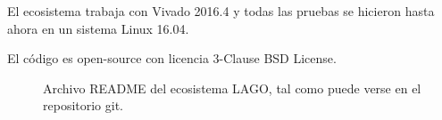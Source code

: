 \documentclass[a4paper,11pt]{article}
\begin{document}
El ecosistema trabaja con Vivado 2016.4
y todas las pruebas se hicieron hasta ahora en un sistema Linux 16.04.
  
El código es open-source con licencia 3-Clause BSD License.

\begin{figure}[!h]
  \centering
  \caption{Archivo README del ecosistema LAGO, tal como puede verse en el
repositorio git.}
  \label{fig:pag_ecosystem}
\end{figure}
\end{document}
